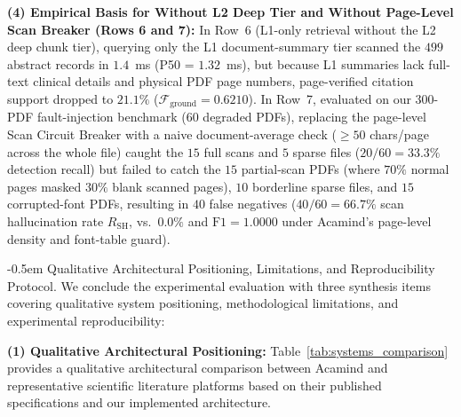 \documentclass[10pt]{SPIIRAS_Proceedings}
\makeatletter
\renewcommand\subsection{\@startsection{subsection}{2}{\parindent}%
  {\z@}%
  {-0.5em}%
  {\normalfont\normalsize\bfseries}}
\makeatother
\begin{document}
\textbf{(4) Empirical Basis for Without L2 Deep Tier and Without Page-Level Scan Breaker (Rows 6 and 7):} In Row~6 (L1-only retrieval without the L2 deep chunk tier), querying only the L1 document-summary tier scanned the $499$ abstract records in $1.4$~ms (P50 = $1.32$~ms), but because L1 summaries lack full-text clinical details and physical PDF page numbers, page-verified citation support dropped to $21.1\%$ ($\mathcal{F}_{\mathrm{ground}} = 0.6210$). In Row~7, evaluated on our 300-PDF fault-injection benchmark (60 degraded PDFs), replacing the page-level Scan Circuit Breaker with a naive document-average check ($\ge 50$ chars/page across the whole file) caught the $15$ full scans and $5$ sparse files ($20/60 = 33.3\%$ detection recall) but failed to catch the $15$ partial-scan PDFs (where $70\%$ normal pages masked $30\%$ blank scanned pages), $10$ borderline sparse files, and $15$ corrupted-font PDFs, resulting in $40$ false negatives ($40/60 = 66.7\%$ scan hallucination rate $R_{\mathrm{SH}}$, vs.\ $0.0\%$ and $\mathrm{F1} = 1.0000$ under Acamind's page-level density and font-table guard).

\subsection{Qualitative Architectural Positioning, Limitations, and Reproducibility Protocol.} \label{sec:limitations} We conclude the experimental evaluation with three synthesis items covering qualitative system positioning, methodological limitations, and experimental reproducibility:

\textbf{(1) Qualitative Architectural Positioning:} Table~\ref{tab:systems_comparison} provides a qualitative architectural comparison between Acamind and representative scientific literature platforms based on their published specifications \cite{skarlinski2024language,liu2023llamaindex} and our implemented architecture.
\end{document}
